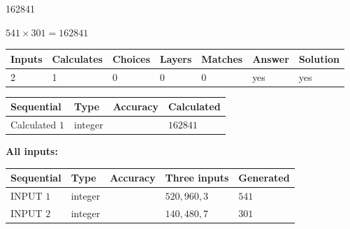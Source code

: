 \documentclass{ctexart}
\begin{document}
\noindent{}
 
 

162841
 
 
\noindent{}
 
 

 
 
 
\noindent{}
 
 

$ %
541 \times  %
301=   %
162841$
 
 
\noindent{}
 
 

 
   
   
   
   
\noindent\begin{tabular}{|l|l|l|l|l|l|l|}
 \hline
Inputs & Calculates & Choices & Layers & Matches & Answer & Solution \\ \hline
 2  & 
 1  & 
 0
  & 
 0  & 
 0  & 
  yes & 
  yes 
  \\ \hline
 \end{tabular}
   
   
   
   
\noindent{}
   
   
  
  
\noindent\begin{tabular}{|l|l|l|l|}
\hline
 Sequential & Type & Accuracy & Calculated \\ 
\hline
 
 
  Calculated $  1 $ & integer &  & 
  $ 162841 $ 
 \\  \hline  
 \end{tabular}
   
   
   
   
\noindent\vspace{0.1in}\hspace{-0.08in} {\textbf{\Large{All inputs: }}}
   
   
  
  
\noindent\begin{tabular}{|l|l|l|l|l|}
\hline
 Sequential & Type & Accuracy & Three inputs & Generated \\ 
\hline
 
 
  INPUT $  1 $ & integer &  & $
 520
 , 
 960
 , 
 3
 $ & $ 541 $ 
 \\  \hline  
 
 
  INPUT $  2 $ & integer &  & $
 140
 , 
 480
 , 
 7
 $ & $ 301 $ 
 \\  \hline  
 \end{tabular}
   
\end{document}
